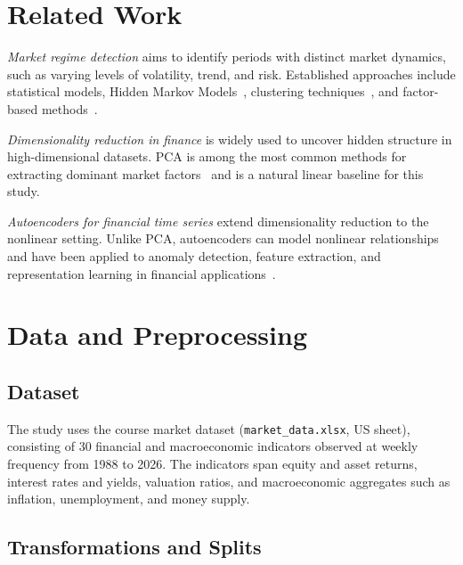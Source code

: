 \documentclass[conference]{IEEEtran}
\begin{document}
\section{Related Work}

\textit{Market regime detection} aims to identify periods with distinct market
dynamics, such as varying levels of volatility, trend, and risk. Established
approaches include statistical models, Hidden Markov Models~\cite{hamilton1989new,nystrup2017regime}, clustering
techniques~\cite{procacci2021portfolio}, and factor-based methods~\cite{fama1993common}.

\textit{Dimensionality reduction in finance} is widely used to uncover hidden
structure in high-dimensional datasets. PCA is among the most common methods for
extracting dominant market factors~\cite{stock2002forecasting,guidolin2007asset} and is a natural linear baseline for this
study.

\textit{Autoencoders for financial time series} extend dimensionality reduction
to the nonlinear setting. Unlike PCA, autoencoders can model nonlinear
relationships and have been applied to anomaly detection, feature extraction,
and representation learning in financial applications~\cite{kaya2020unsupervised}.

\section{Data and Preprocessing}

\subsection{Dataset}

The study uses the course market dataset (\texttt{market\_data.xlsx}, US sheet),
consisting of 30 financial and macroeconomic indicators observed at weekly
frequency from 1988 to 2026. The indicators span equity and asset returns,
interest rates and yields, valuation ratios, and macroeconomic aggregates such
as inflation, unemployment, and money supply.

\subsection{Transformations and Splits}
\end{document}
